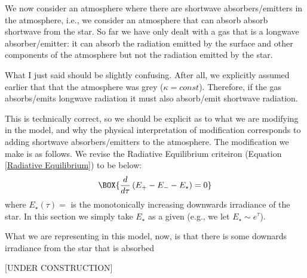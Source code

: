 We now consider an atmosphere where there are shortwave absorbers/emitters in the atmosphere, i.e., we consider an atmosphere that can absorb absorb shortwave from the star. So far we have only dealt with a gas that is a longwave absorber/emitter: it can absorb the radiation emitted by the surface and other components of the atmosphere but not the radiation emitted by the star.

What I just said should be slightly confusing. After all, we explicitly assumed earlier that that the atmosphere was grey ($\kappa = const$). Therefore, if the gas absorbs/emits longwave radiation it must also absorb/emit shortwave radiation.

This is technically correct, so we should be explicit as to what we are modifying in the model, and why the physical interpretation of modification corresponds to adding shortwave absorbers/emitters to the atmosphere. The modification we make is as follows. We revise the Radiative Equilibrium criteiron (Equation \ref{Radiative Equilibrium}) to be below:
\begin{align}
    \BOX{\frac{d}{d\tau}\left( E_+ - E_- - E_{\star} \right)=0}
\end{align}
where $E_\star(\tau)=$ is the monotonically increasing downwards irradiance of the star. In this section we simply take $E_\star$ as a given (e.g., we let $E_\star\sim e^\tau$).

What we are representing in this model, now, is that there is some downards irradiance from the star that is absorbed

[UNDER CONSTRUCTION]